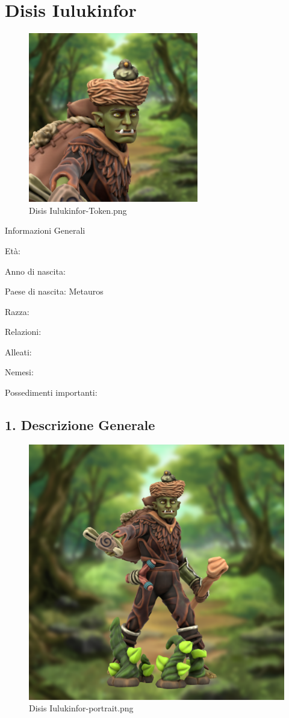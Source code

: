 \section{Disis Iulukinfor}\label{disis-iulukinfor}


\begin{figure}
\centering
\includegraphics{Disis_Iulukinfor-Token.png}
\caption{Disis Iulukinfor-Token.png}
\end{figure}

Informazioni Generali

Età:

Anno di nascita:

Paese di nascita: Metauros

Razza:

Relazioni:

Alleati:

Nemesi:

Possedimenti importanti:


\subsection{1. Descrizione Generale}\label{descrizione-generale}


\begin{figure}
\centering
\includegraphics{Disis_Iulukinfor-portrait.png}
\caption{Disis Iulukinfor-portrait.png}
\end{figure}

